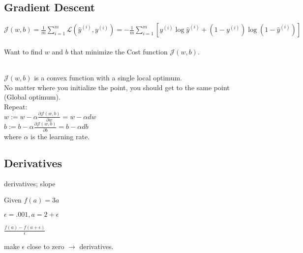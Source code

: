 \documentclass{article}
\begin{document}
\newpage
\subsection{Gradient Descent}

    $\displaystyle \mathcal{J}(w, b) = \frac{1}{m}\sum_{i=1}^{m} \mathcal{L}(\hat{y}^{(i)}, y^{(i)}) = -\frac{1}{m}\sum_{i=1}^{m} [y^{(i)}\log{\hat{y}^{(i)}} + (1-y^{(i)})\log{(1-\hat{y}^{(i)})}]$\\\\

    Want to find $w$ and $b$ that minimize the Cost function $\mathcal{J}(w,b)$.

    \\

    $\mathcal{J}(w,b)$ is a convex function with a single local optimum.\\
    No matter where you initialize the point, you should get to the same point (Global optimum).\\

    Repeat: \\

        $w := w - \alpha \frac{\partial\mathcal{J}(w,b)}{\partial w} = w - \alpha dw$\\

        $b := b - \alpha \frac{\partial\mathcal{J}(w,b)}{\partial b} = b - \alpha db$\\

        where $\alpha$ is the learning rate.\\


\newpage
\subsection{Derivatives}

    derivatives; slope

    Given $f(a) = 3a$

    $\epsilon = .001, a= 2+\epsilon$

    $\frac{f(a)-f(a+\epsilon)}{\epsilon}$

    make $\epsilon$ close to zero $\rightarrow$ derivatives.
\end{document}
